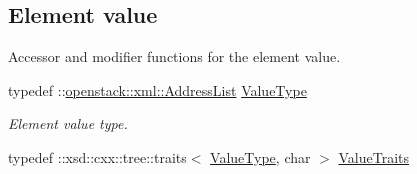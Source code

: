 \subsection*{Element value}
\label{_amgrp2ee2eae1a8c390ea033f241c027da8d6}
Accessor and modifier functions for the element value. \begin{DoxyCompactItemize}
\item 
\hypertarget{classopenstack_1_1xml_1_1Private_ae89b14d8f9124e87a7886e6623d2e44f}{
typedef ::\hyperlink{classopenstack_1_1xml_1_1AddressList}{openstack::xml::AddressList} \hyperlink{classopenstack_1_1xml_1_1Private_ae89b14d8f9124e87a7886e6623d2e44f}{ValueType}}
\label{classopenstack_1_1xml_1_1Private_ae89b14d8f9124e87a7886e6623d2e44f}

\begin{DoxyCompactList}\small\item\em Element value type. \item\end{DoxyCompactList}\item 
\hypertarget{classopenstack_1_1xml_1_1Private_a05806e4b170da609a35e0eb52366acb4}{
typedef ::xsd::cxx::tree::traits$<$ \hyperlink{classopenstack_1_1xml_1_1AddressList}{ValueType}, char $>$ \hyperlink{classopenstack_1_1xml_1_1Private_a05806e4b170da609a35e0eb52366acb4}{ValueTraits}}
\label{classopenstack_1_1xml_1_1Private_a05806e4b170da609a35e0eb52366acb4}


\end{DoxyCompactItemize}
